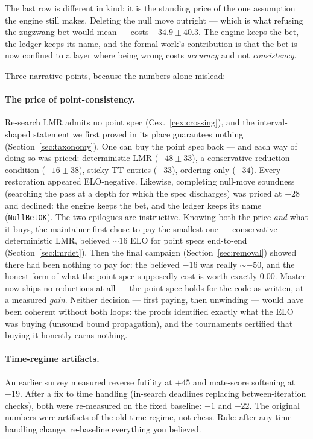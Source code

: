 \documentclass[11pt]{article}
\theoremstyle{plain}
\theoremstyle{definition}
\theoremstyle{remark}
\begin{document}
The last row is different in kind: it is the standing price of the one
assumption the engine still makes.  Deleting the null move outright ---
which is what refusing the zugzwang bet would mean --- costs
$-34.9 \pm 40.3$.  The engine keeps the bet, the ledger keeps its name,
and the formal work's contribution is that the bet is now confined to
a layer where being wrong costs \emph{accuracy} and not
\emph{consistency}.


Three narrative points, because the numbers alone mislead:

\paragraph{The price of point-consistency.}
Re-search LMR admits no point spec (Cex.~\ref{cex:crossing}), and the
interval-shaped statement we first proved in its place guarantees
nothing (Section~\ref{sec:taxonomy}).  One can buy the point spec back
--- and each way of doing so was priced:
deterministic LMR ($-48 \pm 33$), a conservative reduction condition
($-16 \pm 38$), sticky TT entries ($-33$), ordering-only ($-34$).
Every restoration appeared ELO-negative.  Likewise, completing
null-move
soundness (searching the pass at a depth for which the spec discharges)
was priced at $-28$ and declined: the engine keeps the bet, and the
ledger keeps its name (\texttt{NullBetOK}).  The two epilogues are
instructive.  Knowing both the price \emph{and} what it buys, the
maintainer first chose to pay the smallest one --- conservative
deterministic LMR, believed ${\sim}16$ ELO for point specs end-to-end
(Section~\ref{sec:lmrdet}).  Then the final campaign
(Section~\ref{sec:removal}) showed there had been nothing to pay for:
the believed $-16$ was really ${\sim}{-50}$, and the honest form of
what the point spec supposedly cost is worth exactly $0.00$.  Master
now ships no reductions at all --- the point spec holds for the code
as written, at a measured \emph{gain}.  Neither decision --- first
paying, then unwinding --- would have been coherent without both
loops: the proofs identified exactly what the ELO was buying (unsound
bound propagation), and the tournaments certified that buying it
honestly earns nothing.

\paragraph{Time-regime artifacts.}
An earlier survey measured reverse futility at $+45$ and mate-score
softening at $+19$.  After a fix to time handling (in-search deadlines
replacing between-iteration checks), both were re-measured on the fixed
baseline: $-1$ and $-22$.  The original numbers were artifacts of the
old time regime, not chess.  Rule: after any time-handling change,
re-baseline everything you believed.
\end{document}
